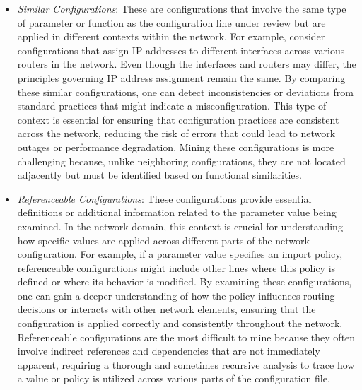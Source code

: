 \begin{enumerate}
\begin{itemize}
        \item \textit{Similar Configurations}: These are configurations that involve the same type of parameter or function as the configuration line under review but are applied in different contexts within the network. For example, consider configurations that assign IP addresses to different interfaces across various routers in the network. Even though the interfaces and routers may differ, the principles governing IP address assignment remain the same. By comparing these similar configurations, one can detect inconsistencies or deviations from standard practices that might indicate a misconfiguration. This type of context is essential for ensuring that configuration practices are consistent across the network, reducing the risk of errors that could lead to network outages or performance degradation. Mining these configurations is more challenging because, unlike neighboring configurations, they are not located adjacently but must be identified based on functional similarities.

        \item \textit{Referenceable Configurations}:
        These configurations provide essential definitions or additional information related to the parameter value being examined. In the network domain, this context is crucial for understanding how specific values are applied across different parts of the network configuration. For example, if a parameter value specifies an import policy, referenceable configurations might include other lines where this policy is defined or where its behavior is modified. By examining these configurations, one can gain a deeper understanding of how the policy influences routing decisions or interacts with other network elements, ensuring that the configuration is applied correctly and consistently throughout the network.
        Referenceable configurations are the most difficult to mine because they often involve indirect references and dependencies that are not immediately apparent, requiring a thorough and sometimes recursive analysis to trace how a value or policy is utilized across various parts of the configuration file.
        \end{itemize}
\end{enumerate}

